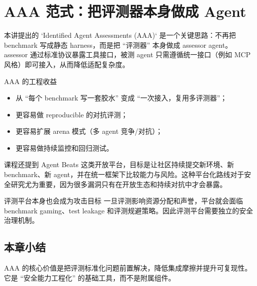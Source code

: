 \section{AAA 范式：把评测器本身做成 Agent}

本讲提出的 `Identified Agent Assessments (AAA)` 是一个关键思路：不再把 benchmark 写成静态 harness，而是把 ``评测器'' 本身做成 assessor agent。assessor 通过标准协议暴露工具接口，被测 agent 只需遵循统一接口（例如 MCP 风格）即可接入，从而降低适配复杂度。

\begin{importantbox}{AAA 的工程收益}
\begin{itemize}
    \item 从 ``每个 benchmark 写一套胶水'' 变成 ``一次接入，复用多评测器''；
    \item 更容易做 reproducible 的对抗评测；
    \item 更容易扩展 arena 模式（多 agent 竞争/对抗）；
    \item 更容易做持续监控和回归测试。
\end{itemize}
\end{importantbox}

课程还提到 Agent Beats 这类开放平台，目标是让社区持续提交新环境、新 benchmark、新 agent，并在统一框架下比较能力与风险。这种平台化路线对于安全研究尤为重要，因为很多漏洞只有在开放生态和持续对抗中才会暴露。

\begin{warningbox}{评测平台本身也会成为攻击目标}
一旦评测影响资源分配和声誉，平台就会面临 benchmark gaming、test leakage 和评测规避策略。因此评测平台需要独立的安全治理机制。
\end{warningbox}

\subsection{本章小结}
AAA 的核心价值是把评测标准化问题前置解决，降低集成摩擦并提升可复现性。它是 ``安全能力工程化'' 的基础工具，而不是附属组件。


